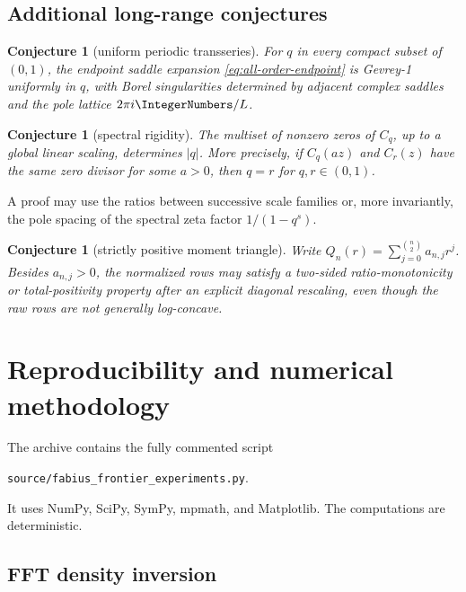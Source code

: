 \documentclass[11pt,oneside]{article}
\newtheorem{conjecture}[theorem]{Conjecture}
\theoremstyle{definition}
\theoremstyle{remark}
\begin{document}
\subsection{Additional long-range conjectures}

\begin{conjecture}[uniform periodic transseries]\label{conj:uniform-transseries}
For $q$ in every compact subset of $(0,1)$, the endpoint saddle expansion \cref{eq:all-order-endpoint} is Gevrey-1 uniformly in $q$, with Borel singularities determined by adjacent complex saddles and the pole lattice $2\pi i\IntegerNumbers/L$.
\end{conjecture}

\begin{conjecture}[spectral rigidity]\label{conj:spectral-rigidity}
The multiset of nonzero zeros of $C_q$, up to a global linear scaling, determines $|q|$.  More precisely, if $C_q(az)$ and $C_r(z)$ have the same zero divisor for some $a>0$, then $q=r$ for $q,r\in(0,1)$.
\end{conjecture}

A proof may use the ratios between successive scale families or, more invariantly, the pole spacing of the spectral zeta factor $1/(1-q^s)$.

\begin{conjecture}[strictly positive moment triangle]\label{conj:moment-triangle}
Write $Q_n(r)=\sum_{j=0}^{\binom n2}a_{n,j}r^j$.  Besides $a_{n,j}>0$, the normalized rows may satisfy a two-sided ratio-monotonicity or total-positivity property after an explicit diagonal rescaling, even though the raw rows are not generally log-concave.
\end{conjecture}

\section{Reproducibility and numerical methodology}

The archive contains the fully commented script
\begin{center}
\texttt{source/fabius\_frontier\_experiments.py}.
\end{center}
It uses NumPy, SciPy, SymPy, mpmath, and Matplotlib.  The computations are deterministic.

\subsection{FFT density inversion}
\end{document}
